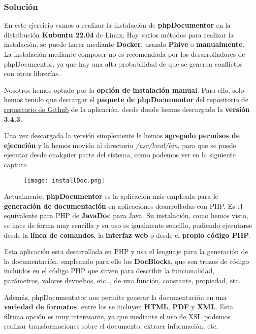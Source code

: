 \subsubsection{Solución}
En este ejercicio vamos a realizar la instalación de \textbf{phpDocumentor} en la distribución \textbf{Kubuntu 22.04} de Linux. Hay varios métodos para realizar la instalación, se puede hacer mediante \textbf{Docker}, usando \textbf{Phive} o \textbf{manualmente}. La instalación mediante composer no es recomendada por los desarrolladores de phpDocumentor, ya que hay una alta probabilidad de que se generen conflictos con otras librerías.

Nosotros hemos optado por la \textbf{opción de instalación manual}. Para ello, solo hemos tenido que descargar el \textbf{paquete de phpDocumentor} del repositorio de \href{https://github.com/phpDocumentor/phpDocumentor/releases}{repositorio de Github} de la aplicación, desde donde hemos descargado la \textbf{versión 3.4.3}.

Una vez descargada la versión simplemente le hemos \textbf{agregado permisos de ejecución} y la hemos movido al directorio \textit{/usr/local/bin}, para que se puede ejecutar desde cualquier parte del sistema, como podemos ver en la siguiente captura.

\begin{figure}[H]
\centering
\texttt{[image: installDoc.png]}
\end{figure}

Actualmente, \textbf{phpDocumentor} es la aplicación más empleada para le \textbf{generación de documentación} en aplicaciones desarrolladas con PHP. Es el equivalente para PHP de \textbf{JavaDoc} para Java. Su instalación, como hemos visto, se hace de forma muy sencilla y su uso es igualmente sencillo, pudiendo ejecutarse desde la \textbf{línea de comandos}, la \textbf{interfaz web} o desde el \textbf{propio código PHP}.

Esta aplicación esta desarrollada en PHP y usa el lenguaje para la generación de la documentación, empleando para ello los \textbf{DocBlocks}, que son trozos de código incluidos en el código PHP que sirven para describir la funcionalidad, parámetros, valores devueltos, etc.., de una función, constante, propiedad, etc.

Además, phpDocumentator nos permite generar la documentación en una \textbf{variedad de formatos}, entre los se incluyen \textbf{HTML}, \textbf{PDF} y \textbf{XML}. Esta última opción es muy interesante, ya que mediante el uso de XSL podemos realizar transformaciones sobre el documento, extraer información, etc.

